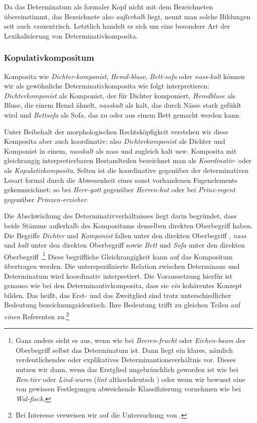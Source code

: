 Da das Determinatum als formaler Kopf nicht mit dem Bezeichneten übereinstimmt, das Bezeichnete also \textit{außerhalb} liegt, nennt man solche Bildungen seit \citet[235]{Bloomfield1935} auch \textit{exo}zentrisch. Letztlich handelt es sich um eine besondere Art der Lexikalisierung von Determinativkomposita.


\subsubsection{Kopulativkompositum}\label{subsubsection:KopKomp}

Komposita wie \textit{Dichter-komponist}, \textit{Hemd-bluse}, \textit{Bett-sofa} oder \textit{nass-kalt} können wir als gewöhnliche Determinativkomposita \zB wie folgt interpretieren: \textit{Dichterkomponist} als Komponist, der für Dichter komponiert, \textit{Hemdbluse} als Bluse, die einem Hemd ähnelt, \textit{nasskalt} als kalt, das durch Nässe stark gefühlt wird und \textit{Bettsofa} als Sofa, das zu oder aus einem Bett gemacht werden kann.

Unter Beibehalt der morphologischen Rechtsköpfigkeit verstehen wir diese Komposita aber auch koordinativ: also \textit{Dichterkomponist} als Dichter und Komponist in einem, \textit{nasskalt} als nass und zugleich kalt usw. Komposita mit gleichrangig interpretierbaren Bestandteilen bezeichnet man als \textit{Koordinativ-} oder als \textit{Kopulativkomposita}. Selten ist die koordinative gegenüber der determinativen Lesart formal durch die Abwesenheit eines sonst vorhandenen Fugenelements gekennzeichnet: so bei \textit{Herr-gott} gegenüber \textit{Herren-hut} oder bei \textit{Prinz-regent} gegenüber \textit{Prinzen-erzieher}.

\newpage
Die Abschwächung des Determinativverhältnisses liegt darin begründet, dass beide Stämme außerhalb des Kompositums denselben direkten Oberbegriff haben. Die Begriffe \textit{Dichter} und \textit{Komponist} fallen unter den direkten Oberbegriff , \textit{nass} und \textit{kalt} unter den direkten Oberbegriff  sowie \textit{Bett} und \textit{Sofa} unter den direkten Oberbegriff .\footnote{Ganz anders sieht es aus, wenn wie bei \textit{Beeren-frucht} oder \textit{Eichen-baum} der Oberbegriff selbst das Determinatum ist. Dann liegt ein klares, nämlich verdeutlichendes oder explikatives Determinantionsverhältnis vor. Dieses nutzen wir \zB dann, wenn das Erstglied ungebräuchlich geworden ist wie bei \textit{Ren-tier} oder \textit{Lind-wurm} (\textit{lint} althochdeutsch ) oder wenn wir bewusst eine von gewissen Festlegungen abweichende Klassifizierung vornehmen wie bei \textit{Wal-fisch}.} Diese begriffliche Gleichrangigkeit kann auf das Kompositum übertragen werden. Die unterspezifizierte Relation zwischen Determinans und Determinatum wird koordinativ interpretiert. Die Voraussetzung hierfür ist genauso wie bei den Determinantivkomposita, dass sie \textit{ein} kohärentes Konzept bilden. Das heißt, das Erst- und das Zweitglied sind trotz unterschiedlicher Bedeutung bezeichnungsidentisch. Ihre Bedeutung trifft zu gleichen Teilen auf \textit{einen} Referenten zu.\footnote{Bei Interesse verweisen wir auf die Untersuchung von \citet{Olsen2001Kopulativ}.}


